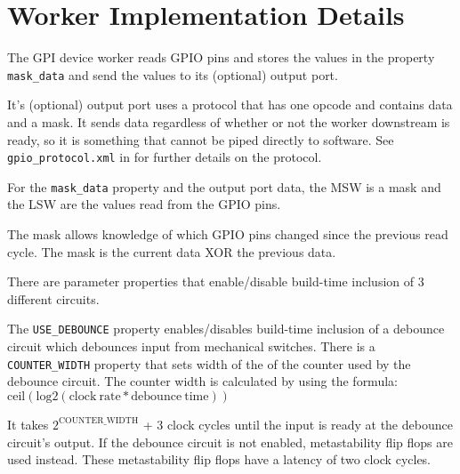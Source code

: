 \documentclass{article}
\begin{document}
\section*{Worker Implementation Details}
\begin{flushleft}

The GPI device worker reads GPIO pins and stores the values in the property \texttt{mask\_data} and send the values to its (optional) output port. \newline

It's (optional) output port uses a protocol that has one opcode and contains data and a mask. It sends data regardless of whether or not the worker downstream is ready, so it is something that cannot be piped directly to software. See \texttt{gpio\_protocol.xml} in   for further details on the protocol. \newline

For the \texttt{mask\_data} property and the output port data, the MSW is a mask and the LSW are the values read from the GPIO pins. \newline

The mask allows knowledge of which GPIO pins changed since the previous read cycle. The mask is the current data XOR the previous data. \newline

There are parameter properties that enable/disable build-time inclusion of 3 different circuits.  \newline

The \texttt{USE\_DEBOUNCE} property enables/disables build-time inclusion of a debounce circuit which debounces input from mechanical switches. 
There is a \texttt{COUNTER\_WIDTH} property that sets width of the of the counter used by the debounce circuit. The counter width is calculated by using the formula: $\mathrm{ceil(log2(clock\:rate * debounce\:time))}$



It takes $2^{\mathrm{COUNTER\_WIDTH}}$ + 3 clock cycles until the input is ready at the debounce circuit's output. If the debounce circuit is not enabled, metastability flip flops are used instead. These metastability flip flops have a latency of two clock cycles. \newline


\end{flushleft}
\end{document}
